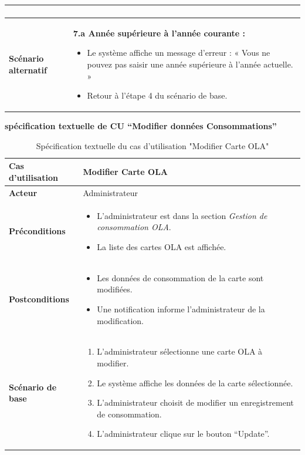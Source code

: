 \documentclass[a4paper,11pt]{report}
\begin{document}
\begin{table}[H]
\begin{tabularx}{\textwidth}{|l|X|}
\begin{enumerate}
    \end{enumerate} \\ \hline
    \textbf{Scénario alternatif} & 
    \textbf{7.a Année supérieure à l’année courante :}
\begin{itemize}
  \item Le système affiche un message d’erreur : « Vous ne pouvez pas saisir une année supérieure à l’année actuelle. »
  \item Retour à l’étape 4 du scénario de base.
\end{itemize} \\ \hline
  \end{tabularx}
\end{table}


\newpage
\textbf{spécification textuelle de CU “Modifier données Consommations”}
\begin{table}[H]
  \centering
  \renewcommand{\arraystretch}{1.5}
  \caption{Spécification textuelle du cas d'utilisation "Modifier Carte OLA"}
  \begin{tabularx}{\textwidth}{|l|X|}
    \hline
    \textbf{Cas d'utilisation} & Modifier Carte OLA \\ \hline
    \textbf{Acteur} & Administrateur \\ \hline
    \textbf{Préconditions} & 
    \begin{itemize}
      \item L'administrateur est dans la section \textit{Gestion de consommation OLA}.
      \item La liste des cartes OLA est affichée.
    \end{itemize} \\ \hline
    \textbf{Postconditions} & 
    \begin{itemize}
      \item Les données de consommation de la carte sont modifiées.
      \item Une notification informe l’administrateur de la modification.
    \end{itemize} \\ \hline
    \textbf{Scénario de base} & 
    \begin{enumerate}
      \item L’administrateur sélectionne une carte OLA à modifier.
      \item Le système affiche les données de la carte sélectionnée.
      \item L’administrateur choisit de modifier un enregistrement de consommation.
      \item L’administrateur clique sur le bouton “Update”.

\end{enumerate}
\end{tabularx}
\end{table}
\end{document}
